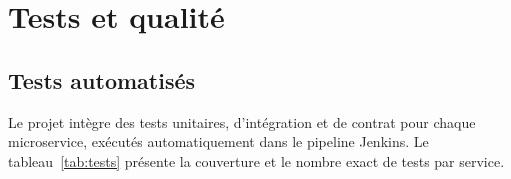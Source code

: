 \section{Tests et qualit\'{e}}
\label{sec:tests}

\subsection{Tests automatis\'{e}s}

Le projet int\`{e}gre des tests unitaires, d'int\'{e}gration et de contrat pour chaque microservice, ex\'{e}cut\'{e}s automatiquement dans le pipeline Jenkins. Le tableau~\ref{tab:tests} pr\'{e}sente la couverture et le nombre exact de tests par service.

